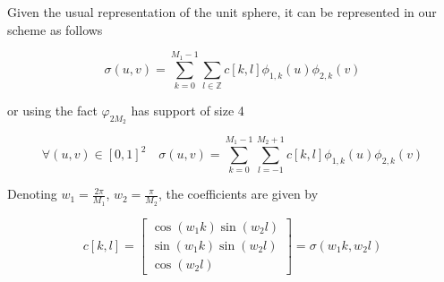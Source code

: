 \documentclass[a4paper, 11pt]{article}
\begin{document}
Given the usual representation of the unit sphere, it can be represented in our scheme as follows

\begin{equation}
    \sigma(u, v) = \sum_{k=0}^{M_1-1} \sum_{l \in \mathbb{Z}} c[k,l] \phi_{1,k}(u)\phi_{2, k}(v)
\end{equation}

or using the fact $\varphi_{2M_2}$ has support of size 4

\begin{equation}
  \boxed{\forall (u,v) \in {[0,1]}^2 \quad \sigma(u, v) = \sum_{k=0}^{M_1-1} \sum_{l=-1}^{M_2+1} c[k,l] 
  \phi_{1,k}(u)\phi_{2, k}(v)}
\end{equation}

Denoting $w_1 = \frac{2\pi}{M_1}$, $w_2 = \frac{\pi}{M_2}$, the coefficients are given by

\begin{equation}
  \boxed{c[k,l]=\begin{bmatrix} \cos(w_1k)\sin(w_2l) \\ \sin(w_1k)\sin(w_2l) \\ \cos(w_2l) \end{bmatrix}=\sigma(w_1k, 
  w_2l)}
\end{equation}

%
%
%
%
%
\end{document}
